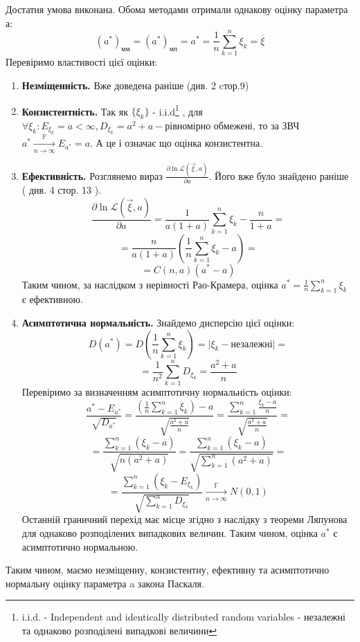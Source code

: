 \documentclass{article}
\begin{document}
Достатня умова виконана.
\newline
Обома методами отримали однакову оцінку параметра а:
$$(a^*)_{\text{мм}} = (a^*)_{\text{мп}} = a^* = \frac{1}{n}
\sum_{k=1}^n \xi_k = \overline{\xi}$$
Перевіримо властивості цієї оцінки:
\begin{enumerate}
  \item \textbf{Незміщенність.} Вже доведена раніше (див. 2 cтор.9)
  \item \textbf{Конзистентність.} Так як $\{\xi_k\}$ - i.i.d\footnote{
    i.i.d. - Independent and identically distributed random variables 
    -  незалежні та однаково розподілені випадкові величини
  }
  , для $\forall \xi_k :E_{\xi_k} = a < \infty, D_{\xi_k} = a^2 + a - 
  \text{рівномірно обмежені}$, то за ЗВЧ
  \newline 
  $a^*\xrightarrow[n\to\infty]{\mathbb{P} }E_{a^*} = a$.
  А це і означає що оцінка конзистентна.
  \newpage
  \item \textbf{Ефективність.} Розглянемо вираз 
  $\frac{\partial\ln \mathcal{L}( \vec{\xi}, a )}{\partial a}$.
  Його вже було знайдено раніше ( див. 4 стор. 13 ).
  $$\frac{\partial\ln \mathcal{L}( \vec{\xi}, a )}{\partial a} = 
  \frac{1}{a(1+a)}\sum_{k=1}^n \xi_k - \frac{n}{1+a} = $$
  $$= \frac{n}{a(1+a)}(\frac{1}{n}\sum_{k=1}^n \xi_k - a) = $$
  $$= C(n, a)(a^* - a)$$
  Таким чином, за наслідком з нерівності Рао-Крамера, оцінка $a^* = 
  \frac{1}{n}\sum_{k=1}^n \xi_k$ є ефективною.
  \item \textbf{Асимптотична нормальність.} Знайдемо дисперсію 
  цієї оцінки:
  $$D(a^*) = D(\frac{1}{n}\sum_{k=1}^n \xi_k) = \bigg|\xi_k - 
  \text{незалежні}\bigg| 
  = $$
  $$= \frac{1}{n^2} \sum_{k=1}^nD_{\xi_k} = \frac{a^2 + a}{n}$$
  Перевіримо за визначенням асимптотичну нормальність оцінки:
  $$\frac{a^* - E_{a^*}}{\sqrt{D_{a^*}}} = 
  \frac{(\frac{1}{n}\sum_{k=1}^n \xi_k) - a}{\sqrt{\frac{a^2 + a}{n}}} = 
  \frac{\sum_{k=1}^n \frac{\xi_k - a}{n}}{\sqrt{\frac{a^2 + a}{n}}} = $$
  $$= \frac{\sum_{k=1}^n(\xi_k - a)}{\sqrt{n(a^2 + a)}} = 
  \frac{\sum_{k=1}^n(\xi_k - a)}{\sqrt{\sum_{k=1}^n(a^2 + a)}} =$$
  $$= \frac{\sum_{k=1}^n(\xi_k - E_{\xi_k})}{\sqrt{
  \sum_{k=1}^nD_{\xi_k}}} \xrightarrow[n\to\infty]{\mathbb{F} } 
  N(0, 1)$$
  Останній граничний перехід має місце згідно з наслідку з теореми 
  Ляпунова для однаково розподілених випадкових величин.
  Таким чином, оцінка $a^*$ є асимптотично нормальною.
\end{enumerate}
Таким чином, маємо незміщенну, конзистентну, ефективну та 
асимптотично нормальну оцінку параметра a закона Паскаля.
\end{document}
